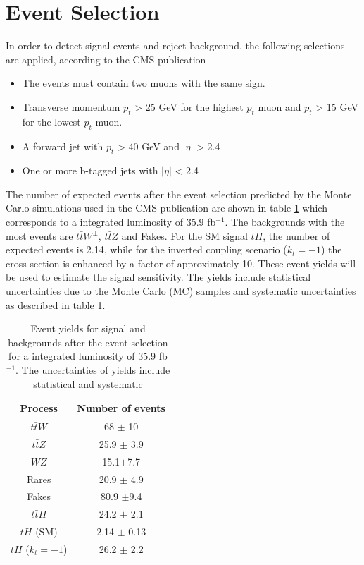 \section{Event Selection}
In order to detect signal events and reject background, the following selections are applied, according to the CMS publication\cite{th1} 
\begin{itemize}
	\item The events must contain two muons with the same sign.
	\item Transverse momentum $p_{t}$ > 25 GeV for the highest $p_t$ muon and $p_{t}$ > 15 GeV for the lowest $p_t$ muon.
	\item A forward jet with $p_t$ > 40 GeV and $|\eta|$ > 2.4
	\item One or more b-tagged jets with $|\eta|$ < 2.4
\end{itemize}
The number of expected events after the event selection predicted by the Monte Carlo simulations used in the CMS publication are shown in table \ref{tth-table} which corresponds to a integrated luminosity of 35.9 fb$^{-1}$\cite{th1}.
The backgrounds with the most events are $t\bar{t} W^\pm$, $t\bar{t}Z$ and Fakes. For the SM signal $tH$, the number of expected events is 2.14, while for the inverted coupling scenario ($k_t=-1$) the cross section is enhanced by a factor of approximately 10. 
These event yields will be used to estimate the signal sensitivity. The yields include statistical uncertainties due to the  Monte Carlo (MC) samples and systematic uncertainties as described in table \ref{tth-table}. 

\begin{table}[ht]
	\centering
	\caption[Event yields for signal and backgrounds after the event selection]{Event yields for signal and backgrounds after the event selection for a integrated luminosity of 35.9 fb$^{-1}$. The uncertainties of yields include statistical and systematic\cite{th1}}
	\begin{tabular}{cc}
		\hline
		Process & Number of events \\
		\hline
		$t\bar{t}W$ & 68 $\pm$ 10 \\
		$t\bar{t}Z$ & 25.9 $\pm$ 3.9\\
		$WZ$ & 15.1$\pm$7.7\\
		Rares & 20.9 $\pm$ 4.9\\
		Fakes & 80.9 $\pm$9.4\\
		$t\bar{t}H$ & 24.2 $\pm$ 2.1 \\
		\hline
		$tH$ (SM) & 2.14 $\pm$ 0.13\\
		$tH$ ($k_t=-1$) &26.2 $\pm$ 2.2
	\end{tabular}	
	\label{tth-table}
\end{table}

